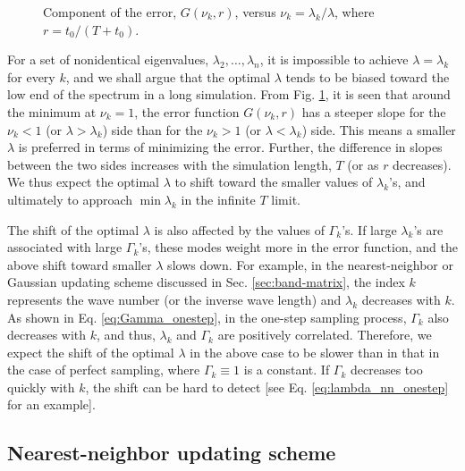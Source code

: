 \documentclass[reprint, floatfix]{revtex4-1}
\begin{document}
\begin{figure}[h]
\begin{center}
  \caption{
    \label{fig:err_component}
    Component of the error, $G(\nu_k, r)$,
    versus $\nu_k = \lambda_k / \lambda$,
    where $r = t_0 / (T + t_0)$.
  }
\end{center}
\end{figure}



For a set of nonidentical eigenvalues,
$\lambda_2, \dots, \lambda_n$,
it is impossible to achieve $\lambda = \lambda_k$
for every $k$,
and we shall argue that
the optimal $\lambda$
tends to be biased toward
the low end of the spectrum
in a long simulation.
%
From Fig. \ref{fig:err_component},
it is seen that around the minimum at $\nu_k = 1$,
the error function $G(\nu_k, r)$
has a steeper slope for the $\nu_k < 1$
(or $\lambda > \lambda_k$) side
than for the $\nu_k > 1$ (or $\lambda < \lambda_k$) side.
%
This means a smaller $\lambda$ is preferred
in terms of minimizing the error.
%
Further, the difference in slopes
between the two sides increases
with the simulation length, $T$
(or as $r$ decreases).
%
We thus expect the optimal $\lambda$
to shift toward the smaller values of $\lambda_k$'s,
and ultimately to approach $\min \lambda_k$
in the infinite $T$ limit.

The shift of the optimal $\lambda$
is also affected by the values of $\Gamma_k$'s.
%
If large $\lambda_k$'s are associated with
large $\Gamma_k$'s,
these modes weight more in the error function,
and the above shift toward smaller $\lambda$
slows down.
%
For example,
in the nearest-neighbor or Gaussian updating scheme
discussed in Sec. \ref{sec:band-matrix},
the index $k$ represents the wave number
(or the inverse wave length)
and $\lambda_k$ decreases with $k$.
%
As shown in Eq. \eqref{eq:Gamma_onestep},
in the one-step sampling process,
$\Gamma_k$ also decreases with $k$,
and thus, $\lambda_k$ and $\Gamma_k$
are positively correlated.
%
Therefore, we expect the shift of the optimal $\lambda$
in the above case
to be slower than in that in the case of perfect sampling,
where $\Gamma_k \equiv 1$ is a constant.
%
If $\Gamma_k$ decreases too quickly with $k$,
the shift can be hard to detect
[see Eq. \eqref{eq:lambda_nn_onestep} for an example].



\subsection{Nearest-neighbor updating scheme}
\end{document}
